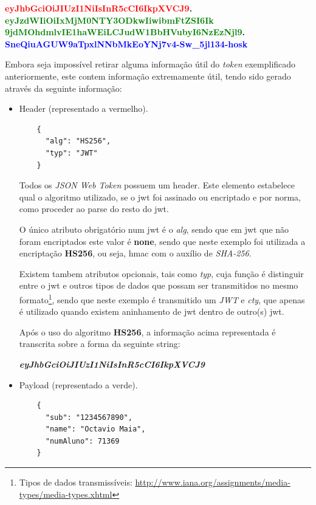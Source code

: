 \begin{center}
    \textbf{\textcolor{red}{eyJhbGciOiJIUzI1NiIsInR5cCI6IkpXVCJ9}.\\
    \textcolor{green}{eyJzdWIiOiIxMjM0NTY3ODkwIiwibmFtZSI6Ik\\9jdMOhdmlvIE1haWEiLCJudW1BbHVubyI6NzEzNjl9}.\\
    \textcolor{blue}{SneQiuAGUW9aTpxlNNbMkEoYNj7v4-Sw\_5jl134-hosk}}
\end{center}

Embora seja impossível retirar alguma informação útil do \emph{token} exemplificado anteriormente, este contem informação extremamente útil, tendo sido gerado através da seguinte informação:

\begin{itemize}
    \item Header (representado a vermelho).
    \begin{verbatim}
    {
      "alg": "HS256",
      "typ": "JWT"
    }
    \end{verbatim}
    
    Todos os \emph{JSON Web Token} possuem um header. Este elemento estabelece qual o algoritmo utilizado, se o \gls{jwt} foi assinado ou encriptado e por norma, como proceder ao parse do resto do \gls{jwt}.
    
    O único atributo obrigatório num \gls{jwt} é o \emph{alg}, sendo que em \gls{jwt} que não foram encriptados este valor é \textbf{none}, sendo que neste exemplo foi utilizada a encriptação \textbf{HS256}, ou seja, \gls{hmac} com o auxílio de \emph{SHA-256}.
    
    Existem tambem atributos opcionais, tais como \emph{typ}, cuja função é distinguir entre o \gls{jwt} e outros tipos de dados que possam ser transmitidos no mesmo formato\footnote{Tipos de dados transmissíveis: \url{http://www.iana.org/assignments/media-types/media-types.xhtml}}, sendo que neste exemplo é transmitido um \emph{JWT} e \emph{cty}, que apenas é utilizado quando existem aninhamento de \gls{jwt} dentro de outro(s) \gls{jwt}.
    
    Após o uso do algoritmo \textbf{HS256}, a informação acima representada é transcrita sobre a forma da seguinte string:
    
    \begin{center}
        \textbf{\emph{eyJhbGciOiJIUzI1NiIsInR5cCI6IkpXVCJ9}}
    \end{center}
    
    \item Payload (representado a verde).
    \begin{verbatim}
    {
      "sub": "1234567890",
      "name": "Octavio Maia",
      "numAluno": 71369
    }
    \end{verbatim}
    

\end{itemize}
